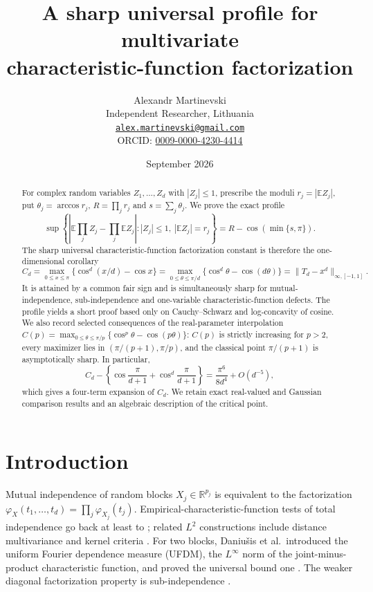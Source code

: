\documentclass[11pt]{article}
\title{A sharp universal profile for multivariate\\ characteristic-function factorization}
\author{Alexandr Martinevski\\
\small Independent Researcher, Lithuania\\
\small \href{mailto:alex.martinevski@gmail.com}{\texttt{alex.martinevski@gmail.com}}\\
\small ORCID: \href{https://orcid.org/0009-0000-4230-4414}{0009-0000-4230-4414}}
\date{September 2026}
\theoremstyle{definition}\newtheorem{definition}[theorem]{Definition}
\theoremstyle{remark}\newtheorem{remark}[theorem]{Remark}
\begin{document}
\maketitle

\begin{abstract}
For complex random variables $Z_1,\ldots,Z_d$ with $|Z_j|\le1$, prescribe the moduli
$r_j=|\mathbb EZ_j|$, put $\theta_j=\arccos r_j$, $R=\prod_jr_j$ and $s=\sum_j\theta_j$. We prove the exact profile
\[
\sup\left\{\left|\mathbb E\prod_jZ_j-\prod_j\mathbb EZ_j\right|:|Z_j|\le1,\ |\mathbb EZ_j|=r_j\right\}
=R-\cos(\min\{s,\pi\}).
\]
The sharp universal characteristic-function factorization constant is therefore the one-dimensional corollary
\[
C_d=\max_{0\le x\le\pi}\{\cos^d(x/d)-\cos x\}
=\max_{0\le\theta\le\pi/d}\{\cos^d\theta-\cos(d\theta)\}
=\|T_d-x^d\|_{\infty,[-1,1]}.
\]
It is attained by a common fair sign and is simultaneously sharp for mutual-independence, sub-independence and
one-variable characteristic-function defects. The profile yields a short proof based only on Cauchy--Schwarz and
log-concavity of cosine. We also record selected consequences of the real-parameter interpolation
$C(p)=\max_{0\le\theta\le\pi/p}\{\cos^p\theta-\cos(p\theta)\}$: $C(p)$ is strictly increasing for $p>2$, every maximizer lies in
$(\pi/(p+1),\pi/p)$, and the classical point $\pi/(p+1)$ is asymptotically sharp. In particular,
\[
C_d-\left\{\cos\frac\pi{d+1}+\cos^d\frac\pi{d+1}\right\}
=\frac{\pi^6}{8d^4}+O(d^{-5}),
\]
which gives a four-term expansion of $C_d$. We retain exact real-valued and Gaussian comparison results and an
algebraic description of the critical point.
\end{abstract}

\section{Introduction}
Mutual independence of random blocks $X_j\in\mathbb R^{p_j}$ is equivalent to the factorization
$\varphi_X(t_1,\dots,t_d)=\prod_j\varphi_{X_j}(t_j)$. Empirical-characteristic-function tests of total independence go
back at least to \cite{Csorgo1985,Kankainen1995}; related $L^2$ constructions include distance multivariance and kernel
criteria \cite{BKRS2019,Pfister2018}. For two blocks, Daniu\v{s}is et al.\ introduced the uniform Fourier dependence
measure (UFDM), the $L^\infty$ norm of the joint-minus-product characteristic function, and proved the universal bound
one \cite{Daniusis2025}. The weaker diagonal factorization property is sub-independence
\cite{EHSV2010,Hamedani2013,Schennach2019}.
\end{document}
